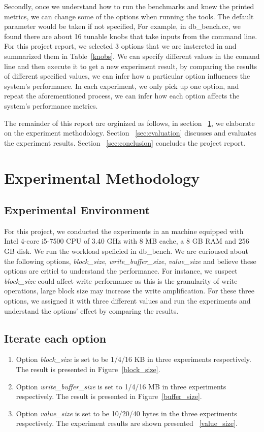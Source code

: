 \documentclass[letter,twocolumn,10pt]{article}
\begin{document}
Secondly, once we understand how to run the benchmarks and knew the printed metrics, we can change some of the options when running the tools. The default parameter would be taken if not specified, For example, in \textsf{db\_bench.cc}, we found there are about 16 tunable knobs that take inputs from the command line. For this project report, we selected 3 options that we are instereted in and summarized them in Table~\ref{knobs}. We can specify different values in the comand line and then execute it to get a new experiment result, by comparing the results of different specified values, we can infer how a particular option influences the system's performance. In each experiment, we only pick up one option, and repeat the aforementioned process, we can infer how each option affects the system's performance metrics.

The remainder of this report are orginized as follows, in section ~\ref{sec:experiment}, we elaborate on the experiment methodology. Section ~\ref{sec:evaluation} discusses and evaluates the experiment results. Section ~\ref{sec:conclusion} concludes the project report. 
\section{Experimental Methodology}
\label{sec:experiment}
\subsection {Experimental Environment}
For this project, we conducted the experiments in an machine equipped with Intel 4-core
i5-7500 CPU of 3.40 GHz with 8 MB cache, a 8 GB RAM and 256 GB disk. We run the workload speficied in \textsf{db\_bench}. We are curioused about the following options, \textit{block\_size}, \textit{write\_buffer\_size}, \textit{value\_size} and believe these options are criticl to understand the performance. For instance, we suspect \textit{block\_size} could affect write performance as this is the granularity of write operations, large block size may increase the write amplification. For these three options, we assigned it with three different values and run the experiments and understand the options' effect by comparing the results.
\subsection {Iterate each option}
\begin{enumerate}
\item Option \textit{block\_size} is set to be 1/4/16 KB in three experiments respectively. The result is presented in Figure~\ref{block_size}.
\item Option \textit{write\_buffer\_size} is set to 1/4/16 MB in three experiments respectively. The result is presented in Figure~\ref{buffer_size}.
\item Option \textit{value\_size} is set to be 10/20/40 bytes in the three experiments respectively. The experiment results are shown presented ~\ref{value_size}.
\end{enumerate}
\end{document}
